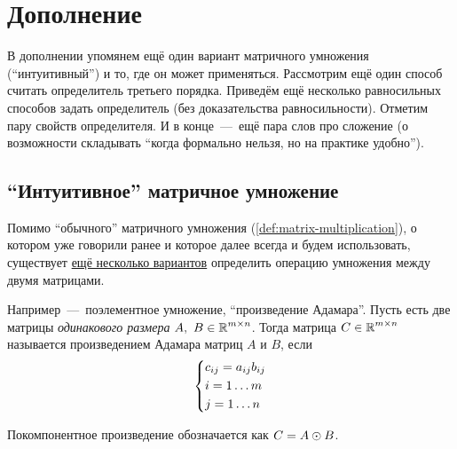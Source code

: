 \documentclass[a4paper,12pt]{article}
\begin{document}
  
  \newpage
  
  
  \section{Дополнение}
  
  В дополнении упомянем ещё один вариант матричного умножения (``интуитивный'') и то, где он может применяться.
  Рассмотрим ещё один способ считать определитель третьего порядка.
  Приведём ещё несколько равносильных способов задать определитель (без доказательства равносильности).
  Отметим пару свойств определителя.
  И в конце~---~ещё пара слов про сложение (о возможности складывать ``когда формально нельзя, но на практике удобно'').
  
  
  \subsection{``Интуитивное'' матричное умножение}
  
  Помимо ``обычного'' матричного умножения (\ref{def:matrix-multiplication}), о котором уже говорили ранее и которое далее всегда и будем использовать, существует \href{https://en.wikipedia.org/wiki/Hadamard\_product\_(matrices)\#The\_mixed-product\_property}{ещё несколько вариантов} определить операцию умножения между двумя матрицами.
  
  Например~---~поэлементное умножение, ``произведение Адамара''.
  Пусть есть две матрицы \emph{одинакового размера} $A,\ B \hm\in \RR^{m \times n}$.
  Тогда матрица $C \hm\in \RR^{m \times n}$ называется произведением Адамара матриц $A$ и $B$, если
  \[
    \left\{
      \begin{aligned}
        &c_{ij} \hm= a_{ij} b_{ij}\\
        &i \hm= 1 \ldots m\\
        &j \hm= 1 \ldots n
      \end{aligned}
    \right.
  \]
  
  Покомпонентное произведение обозначается как $C \hm= A \odot B$.
  
\end{document}
